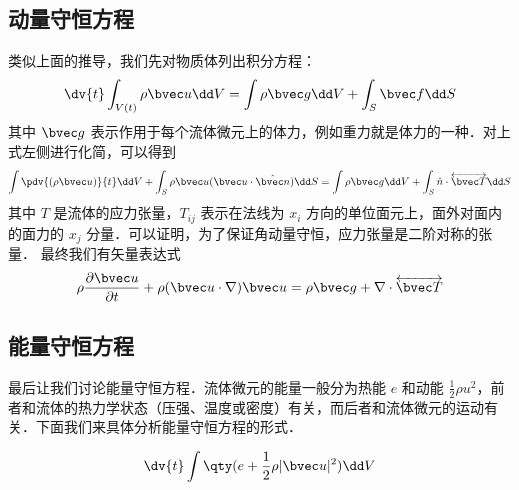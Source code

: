 \subsection{动量守恒方程}
类似上面的推导，我们先对物质体列出积分方程：
\begin{equation}
\dv{t}\int_{V(t)} \rho \bvec u \dd V=\int \rho \bvec g\dd V+\int_S \bvec f\dd S
\end{equation}
其中 $\bvec g$ 表示作用于每个流体微元上的体力，例如重力就是体力的一种．对上式左侧进行化简，可以得到
\begin{equation}
\int \pdv{(\rho \bvec u)}{t}\dd V+\int_S\rho \bvec u (\bvec u\cdot \hat{\bvec n})\dd S=\int \rho\bvec g\dd V+\int_S \hat n\cdot \overleftrightarrow {\bvec T}\dd S
\end{equation}
其中 $T$ 是流体的应力张量，$T_{ij}$ 表示在法线为 $x_i$ 方向的单位面元上，面外对面内的面力的 $x_j$ 分量．可以证明，为了保证角动量守恒，应力张量是二阶对称的张量．
最终我们有矢量表达式
\begin{equation}
\rho \frac{\partial \bvec u}{\partial t}+\rho(\bvec u\cdot \nabla)\bvec u=\rho \bvec g+\nabla\cdot \overleftrightarrow {\bvec T}
\end{equation}
\subsection{能量守恒方程}
最后让我们讨论能量守恒方程．流体微元的能量一般分为热能 $e$ 和动能 $\frac{1}{2}\rho u^2$，前者和流体的热力学状态（压强、温度或密度）有关，而后者和流体微元的运动有关．下面我们来具体分析能量守恒方程的形式．

\begin{equation}
\dv{t} \int \qty(e+\frac{1}{2}\rho |\bvec u|^2)\dd V
\end{equation}

